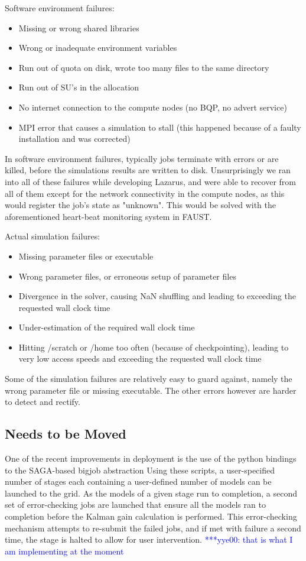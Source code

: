 \documentclass[conference,final]{IEEEtran}
\newcommand{\jhanote}[1]{ {\textcolor{red} { ***Jha: #1 }}}
\newcommand{\yyenote}[1]{ {\textcolor{blue} { ***yye00: #1 }}}
\newcommand{\jhanote}[1]{}
\newcommand{\yyenote}[1]{}
\begin{document}
Software environment failures:
\begin{itemize}
\item{Missing or wrong shared libraries}
\item{Wrong or inadequate environment variables}
\item{Run out of quota on disk, wrote too many files to the same directory}
\item{Run out of SU's in the allocation}
\item{No internet connection to the compute nodes (no BQP, no advert service)}
\item{MPI error that causes a simulation to stall (this happened because of a faulty installation and was corrected)}
\end{itemize}
In software environment failures, typically jobs terminate with errors or 
are killed, before the simulations results are written to disk. Unsurprisingly we ran
into all of these failures while developing Lazarus, and were able
to recover from all of them except for the network connectivity in the compute
nodes, as this would register the job's state as "unknown". This would be solved
with the aforementioned heart-beat monitoring system in FAUST.

Actual simulation failures:
\begin{itemize}
\item{Missing parameter files or executable}
\item{Wrong parameter files, or erroneous setup of parameter files}
\item{Divergence in the solver, causing NaN shuffling and leading to exceeding the requested wall clock time}
\item{Under-estimation of the required wall clock time}
\item{Hitting /scratch or /home too often (because of checkpointing), leading to very low access speeds and exceeding the requested wall clock time}
\end{itemize}
Some of the simulation failures are relatively easy to guard against,
namely the wrong parameter file or missing executable. The other errors
however are harder to detect and rectify.

\subsection{Needs to be Moved}
One of the recent improvements in deployment is the use of the python
bindings to the SAGA-based bigjob abstraction %
Using these scripts, a user-specified number of stages each containing
a user-defined number of models can be launched to the grid. As the
models of a given stage run to completion, a second set of
error-checking jobs are launched that ensure all the models ran to
completion before the Kalman gain calculation is performed. This
error-checking mechanism attempts to re-submit the failed jobs, and if
met with failure a second time, the stage is halted to allow for user
intervention. \yyenote{that is what I am implementing at the moment}
\end{document}
